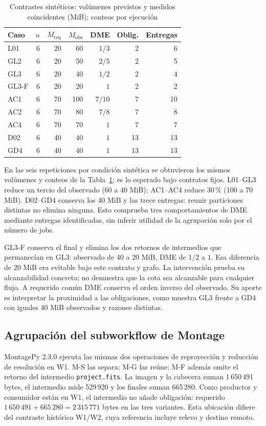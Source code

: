 \begin{table}[htbp]\centering\small
\caption{Contrastes sintéticos: volúmenes previstos y medidos coincidentes (MiB); conteos por ejecución}\label{tab:prospectiva}
\begin{tabular}{@{}lrrrrrr@{}}
\toprule Caso & $n$ & $M_{\mathrm{req}}$ & $M_{\mathrm{obs}}$ & DME & Oblig. & Entregas\\\midrule
L01 & 6 & 20 & 60 & $1/3$ & 2 & 6\\
GL2 & 6 & 20 & 50 & $2/5$ & 2 & 5\\
GL3 & 6 & 20 & 40 & $1/2$ & 2 & 4\\
GL3-F & 6 & 20 & 20 & $1$ & 2 & 2\\
AC1 & 6 & 70 & 100 & $7/10$ & 7 & 10\\
AC2 & 6 & 70 & 80 & $7/8$ & 7 & 8\\
AC4 & 6 & 70 & 70 & $1$ & 7 & 7\\
D02 & 6 & 40 & 40 & $1$ & 13 & 13\\
GD4 & 6 & 40 & 40 & $1$ & 13 & 13\\
\bottomrule\end{tabular}
\end{table}
En las seis repeticiones por condición sintética se obtuvieron los mismos volúmenes y conteos de la Tabla~\ref{tab:prospectiva}; es lo esperado bajo contratos fijos. L01--GL3 reduce un tercio del observado (60 a 40 MiB); AC1--AC4 reduce 30\,\% (100 a 70 MiB). D02--GD4 conserva los 40 MiB y las trece entregas: reunir particiones distintas no elimina ninguna. Esto comprueba tres comportamientos de DME mediante entregas identificadas, sin inferir utilidad de la agrupación solo por el número de jobs.

GL3-F conserva el final y elimina los dos retornos de intermedios que permanecían en GL3: observado de 40 a 20 MiB, DME de $1/2$ a $1$. Esa diferencia de 20 MiB era evitable bajo este contrato y grafo. La intervención prueba su alcanzabilidad concreta; no demuestra que la cota sea alcanzable para cualquier flujo. A requerido común DME conserva el orden inverso del observado. Su aporte es interpretar la proximidad a las obligaciones, como muestra GL3 frente a GD4 con iguales 40 MiB observados y razones distintas.

\subsection{Agrupación del subworkflow de Montage}
MontagePy 2.3.0 \citep{good2025} ejecuta las mismas dos operaciones de reproyección y reducción de resolución en W1. M-S las separa; M-G las reúne; M-F además omite el retorno del intermedio \texttt{project.fits}. La imagen y la cabecera suman 1\,650\,491 bytes, el intermedio mide 529\,920 y los finales suman 665\,280. Como productor y consumidor están en W1, el intermedio no añade obligación: requerido $1\,650\,491+665\,280=2\,315\,771$ bytes en las tres variantes. Esta ubicación difiere del contraste histórico W1/W2, cuya referencia incluye relevo y destino remoto.


